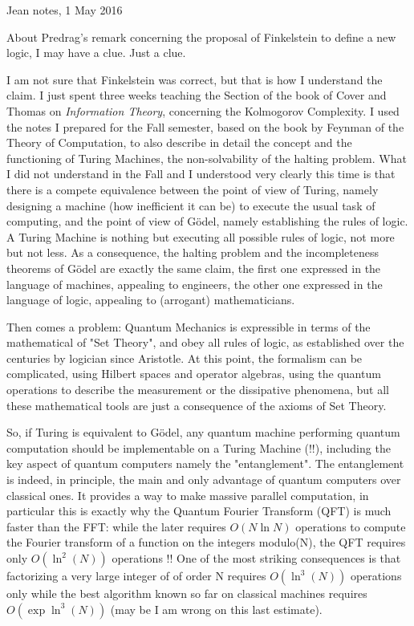 Jean notes, 1 May 2016

About Predrag's remark concerning the proposal of Finkelstein to define a
new logic, I may have a clue. Just a clue.

I am not sure that Finkelstein was correct, but that is how I understand
the claim. I just spent three weeks teaching the Section of the book of
Cover and Thomas on {\em Information Theory}, concerning the Kolmogorov
Complexity. I used the notes I prepared for the Fall semester, based on
the book by Feynman of the Theory of Computation, to also describe in
detail the concept and the functioning of Turing Machines, the
non-solvability of the halting problem. What I did not understand in the
Fall and I understood very clearly this time is that there is a compete
equivalence between the point of view of Turing, namely designing a
machine (how inefficient it can be) to execute the usual task of
computing, and the point of view of G\"odel, namely establishing the
rules of logic. A Turing Machine is nothing but executing all possible
rules of logic, not more but not less. As a consequence, the halting
problem and the incompleteness theorems of G\"odel are exactly the same
claim, the first one expressed in the language of machines, appealing to
engineers, the other one expressed in the language of logic, appealing to
(arrogant) mathematicians.


    Then comes a problem: Quantum Mechanics is expressible in terms of the
    mathematical of "Set Theory", and obey all rules of logic, as established
    over the centuries by logician since Aristotle. At this point, the formalism
    can be complicated, using Hilbert spaces and operator algebras, using the
    quantum operations to describe the measurement or the dissipative phenomena,
    but all these mathematical tools are just a consequence of the axioms of Set
    Theory.


    So, if Turing is equivalent to G\"odel, any quantum machine performing quantum
    computation should be implementable on a Turing Machine (!!), including the
    key aspect of quantum computers namely the "entanglement". The entanglement
    is indeed, in principle, the main and only advantage of quantum computers
    over classical ones. It provides a way to make massive parallel computation,
    in particular this is exactly why the Quantum Fourier Transform (QFT) is
    much faster than the FFT: while the later requires $O(N \ln N)$ operations to
    compute the Fourier transform of a function on the integers modulo(N), the
    QFT requires only $O(\ln^2(N))$ operations !! One of the most striking
    consequences is that factorizing a very large integer of of order N requires
    $O(\ln^3(N))$ operations only while the best algorithm known so far on
    classical machines requires $O(\exp{ \ln^3(N)})$ (may be I am wrong on this last
    estimate).


